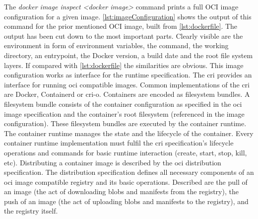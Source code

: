 \documentclass[titlepage]{report}
\begin{document}
The \emph{docker image inspect <docker image>} command prints a full OCI image configuration for a given image. \autoref{lst:imageConfiguration} shows the output of this command
for the prior mentioned OCI image, built from \autoref{lst:dockerfile}. The output has been cut down to the most important parts. Clearly visible are the environment in form of environment
variables, the command, the working directory, an entrypoint, the Docker version, a build date and the root file system layers. If compared with \autoref{lst:dockerfile} the similarities are obvious. 
This image configuration works as interface for the runtime specification. The \gls{cri} provides an interface for running \gls{oci} compatible images. Common implementations of the \gls{cri} are
Docker, Containerd\cite{Containerd} or cri-o\cite{CRIO}. Containers are encoded as filesystem bundles. A filesystem bundle consists of the container configuration as specified in the \gls{oci} image specification
and the container's root filesystem (referenced in the image configuration)\cite{FilesystemBundle}. These filesystem bundles are executed by the container runtime. The container runtime manages the state and the lifecycle
of the container. Every container runtime implementation must fulfil the \gls{cri} specification's lifecycle operations and commands for basic runtime interaction (create, start, stop, kill, etc).
Distributing a container image is described by the \gls{oci} distribution specification. The distribution specification defines all necessary components of an \gls{oci} image compatible registry
and its basic operations. Described are the pull of an image (the act of downloading \glspl{blob} and manifests from the registry), the push of an image (the act of uploading \glspl{blob} and manifests to the registry),
and the registry itself. 
\end{document}
